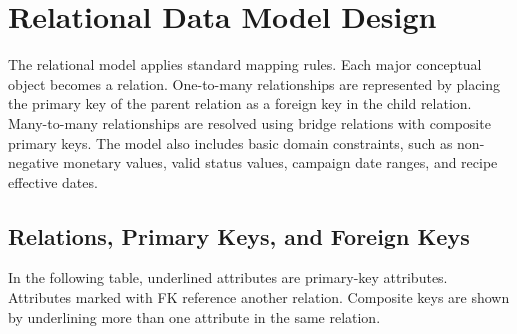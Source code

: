 \documentclass[12pt,a4paper]{article}
\begin{document}
\section{Relational Data Model Design}

The relational model applies standard mapping rules. Each major conceptual object becomes a relation. One-to-many relationships are represented by placing the primary key of the parent relation as a foreign key in the child relation. Many-to-many relationships are resolved using bridge relations with composite primary keys. The model also includes basic domain constraints, such as non-negative monetary values, valid status values, campaign date ranges, and recipe effective dates.

\subsection{Relations, Primary Keys, and Foreign Keys}

In the following table, underlined attributes are primary-key attributes. Attributes marked with FK reference another relation. Composite keys are shown by underlining more than one attribute in the same relation.
\end{document}
